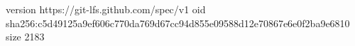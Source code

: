version https://git-lfs.github.com/spec/v1
oid sha256:c5d49125a9ef606c770da769d67cc94d855e09588d12e70867e6e0f2ba9e6810
size 2183
